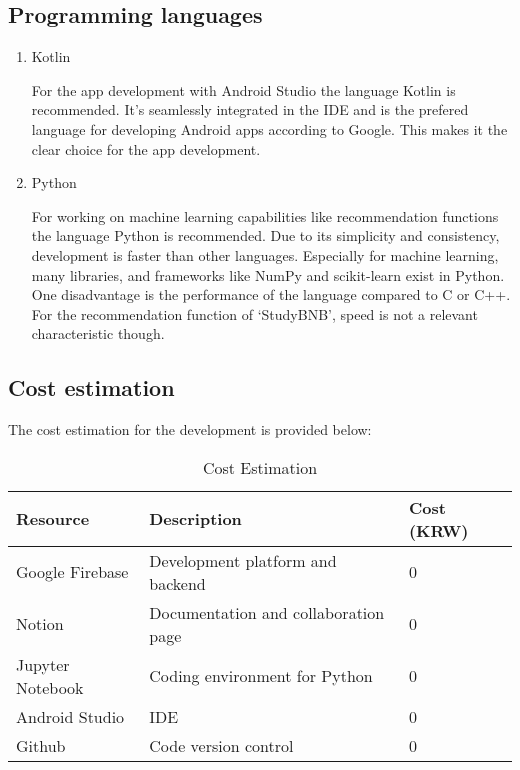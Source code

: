 \documentclass[conference]{IEEEtran}
\begin{document}
\subsection{Programming languages}

\begin{enumerate}
\item Kotlin

For the app development with Android Studio the language Kotlin is recommended. It's seamlessly integrated in the IDE and is the prefered language for developing Android apps according to Google. This makes it the clear choice for the app development.

\item Python

For working on machine learning capabilities like recommendation functions the language Python is recommended. Due to its simplicity and consistency, development is faster than other languages. Especially for machine learning, many libraries, and frameworks like NumPy and scikit-learn exist in Python. One disadvantage is the performance of the language compared to C or C++. For the recommendation function of ‘StudyBNB’, speed is not a relevant characteristic though.

\end{enumerate}

\subsection{Cost estimation}

The cost estimation for the development is provided below:

\begin{table}[H]
\caption{Cost Estimation}
\begin{center}
\begin{tabular}{|p{1.5cm}|p{4cm}|p{1cm}|}
\hline
\textbf{Resource} & \textbf{Description} & \textbf{Cost (KRW)} \\
\hline
Google Firebase	& Development platform and backend & 0 \\
\hline
Notion & Documentation and collaboration page & 0 \\
\hline
Jupyter Notebook & Coding environment for Python & 0 \\
\hline
Android Studio & IDE & 0 \\
\hline
Github & Code version control & 0\\
\hline
\end{tabular}
\end{center}
\end{table}
\end{document}
